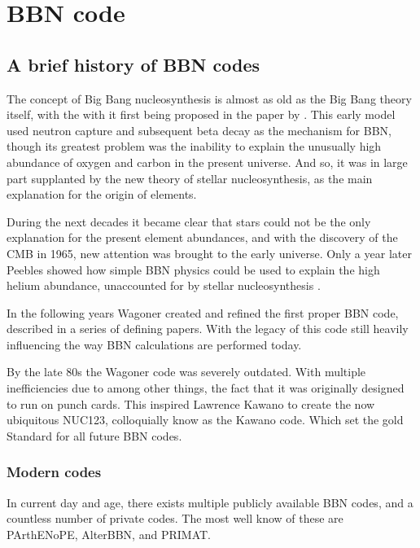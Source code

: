 
\chapter{BBN code}
\label{chap:BBNcode}

\section{A brief history of BBN codes}
\label{sec:BBN_history}

The concept of Big Bang nucleosynthesis is almost as old as the Big Bang theory itself, with the with it first being proposed in the paper by \textcite{Gamov48}. This early model used neutron capture and subsequent beta decay as the mechanism for BBN, though its greatest problem was the inability to explain the unusually high abundance of oxygen and carbon in the present universe. And so, it was in large part supplanted by the new theory of stellar nucleosynthesis, as the main explanation for the origin of elements. 

During the next decades it became clear that stars could not be the only explanation for the present element abundances, and with the discovery of the CMB in 1965, new attention was brought to the early universe. 
Only a year later Peebles showed how simple BBN physics could be used to explain the high helium abundance, unaccounted for by stellar nucleosynthesis \cite{Peebles66}.

In the following years Wagoner created and refined the first proper BBN code, described in a series of defining papers\cite{Wagoner67}\cite{Wagoner69}\cite{Wagoner72}. With the legacy of this code still heavily influencing the way BBN calculations are performed today.

By the late 80s the Wagoner code was severely outdated. With multiple inefficiencies due to among other things, the fact that it was originally designed to run on punch cards. This inspired Lawrence Kawano to create the now ubiquitous NUC123, colloquially know as the Kawano code\cite{Kawano}. Which set the gold Standard for all future BBN codes. 

\subsection{Modern codes}
\label{sec:newcodes}
In current day and age, there exists multiple publicly available BBN codes, and a countless number of private codes. The most well know of these are PArthENoPE, AlterBBN, and PRIMAT.

